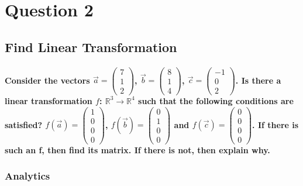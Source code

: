 \section{Question 2}
\subsection{Find Linear Transformation}
\paragraph{Consider the vectors $ \vec{a}= \begin{pmatrix}
            7 \\
            1 \\
            2
        \end{pmatrix}$,
    $ \vec{b}= \begin{pmatrix}
            8 \\
            1 \\
            4
        \end{pmatrix}$,
    $ \vec{c}= \begin{pmatrix}
            -1 \\
            0  \\
            2
        \end{pmatrix}$.
    Is there a linear transformation $f$: $\mathbb{R}^{3} \rightarrow \mathbb{R}^{4}$
    such that the following conditions are satisfied?
    $ f(\vec{a})= \begin{pmatrix}
            1 \\
            0 \\
            0 \\
            0
        \end{pmatrix}$,
    $ f(\vec{b})= \begin{pmatrix}
            0 \\
            1 \\
            0 \\
            0
        \end{pmatrix}$ and
    $ f(\vec{c})= \begin{pmatrix}
            0 \\
            0 \\
            0 \\
            0
        \end{pmatrix}$.
    If there is such an f, then find its matrix. If there is not, then explain why.
}
% 
% 
% 
% 
% 
\subsubsection{Analytics}
